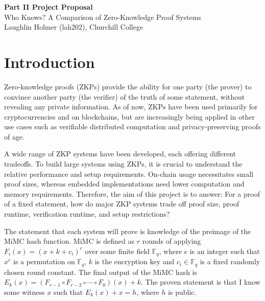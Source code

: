 \documentclass[11pt,a4paper]{article}
\begin{document}
\begin{center}
    {\LARGE \textbf{Part II Project Proposal}}\\[1em]
    {\Large Who Knows? A Comparison of Zero-Knowledge Proof Systems}\\[2em]
    {\large Laughlin Holmer (lah202), Churchill College}\\[1em]
\end{center}

\vspace{1em}

\section{Introduction}

Zero-knowledge proofs (ZKPs) provide the ability for one party (the prover) to convince another party (the verifier) of the truth of some statement, without revealing any private information. As of now, ZKPs have been used primarily for cryptocurrencies and on blockchains, but are increasingly being applied in other use cases such as verifiable distributed computation and privacy-preserving proofs of age.

A wide range of ZKP systems have been developed, each offering different tradeoffs. To build large systems using ZKPs, it is crucial to understand the relative performance and setup requirements. On-chain usage necessitates small proof sizes, whereas embedded implementations need lower computation and memory requirements. Therefore, the aim of this project is to answer: For a proof of a fixed statement, how do major ZKP systems trade off proof size, proof runtime, verification runtime, and setup restrictions?

The statement that each system will prove is knowledge of the preimage of the MiMC hash function. MiMC is defined as $r$ rounds of applying $F_i(x) = (x + k + c_i)^e$ over some finite field $\mathbb{F}_q$, where $e$ is an integer such that $x^e$ is a permutation on $\mathbb{F}_q$, $k$ is the encryption key and $c_i \in \mathbb{F}_q$ is a fixed randomly chosen round constant. The final output of the MiMC hash is $E_k(x) =(F_{r-1} \circ F_{r-2} \circ \cdots \circ F_0)(x) + k$. The proven statement is that I know some witness $x$ such that $E_k(x) + x = h$, where $h$ is public.
\end{document}
